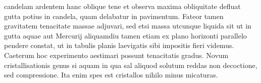  candelam\protect{} ardentem hanc oblique tene et observa  maxima obliquitate defluat gutta potius in candela, quam delabatur in pavimentum. Fateor tamen gravitatem\protect{} tenacitate\protect{} massae\protect{} adjuvari, sed etsi massa utcunque liquida sit ut in gutta aquae aut Mercurij\protect{} aliquamdiu tamen etiam ex plano horizonti parallelo pendere constat, ut in tabulis planis laevigatis sibi impositis fieri videmus.
Caeterum hoc experimento aestimari possunt tenacitatis gradus.
\pend
\pstart%
Novum cristallisationis\protect{} genus si aquam in qua sal aliquod solutum  reddas non decoctione, sed compressione. Ita enim spes est cristallos\protect{} nihilo minus micaturas.
\pend
